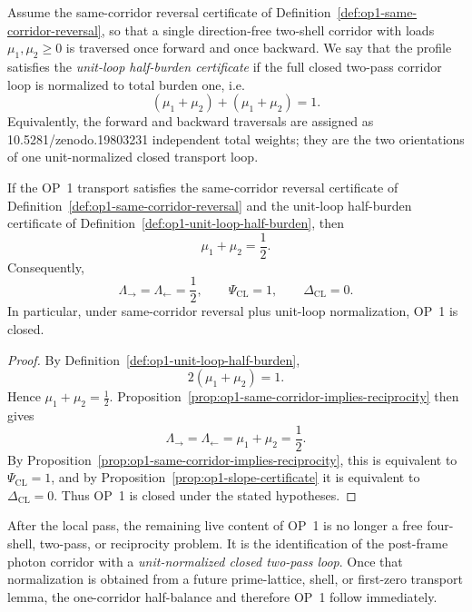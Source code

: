 \begin{definition}
\label{def:op1-unit-loop-half-burden}
Assume the same-corridor reversal certificate of Definition~\ref{def:op1-same-corridor-reversal}, so that a single direction-free two-shell corridor with loads \(\mu_1,\mu_2\ge 0\) is traversed once forward and once backward. We say that the profile satisfies the \emph{unit-loop half-burden certificate} if the full closed two-pass corridor loop is normalized to total burden one, i.e.
\[
 (\mu_1+\mu_2)+(\mu_1+\mu_2)=1.
\]
Equivalently, the forward and backward traversals are assigned as 10.5281/zenodo.19803231 independent total weights; they are the two orientations of one unit-normalized closed transport loop.
\end{definition}

\begin{proposition}
\label{prop:op1-unit-loop-half-burden}
If the OP~1 transport satisfies the same-corridor reversal certificate of Definition~\ref{def:op1-same-corridor-reversal} and the unit-loop half-burden certificate of Definition~\ref{def:op1-unit-loop-half-burden}, then
\[
 \mu_1+\mu_2=\frac12.
\]
Consequently,
\[
 \Lambda_{\rightarrow}=\Lambda_{\leftarrow}=\frac12,
\qquad
 \Psi_{\mathrm{CL}}=1,
\qquad
 \Delta_{\mathrm{CL}}=0.
\]
In particular, under same-corridor reversal plus unit-loop normalization, OP~1 is closed.
\end{proposition}

\begin{proof}
By Definition~\ref{def:op1-unit-loop-half-burden},
\[
 2(\mu_1+\mu_2)=1.
\]
Hence \(\mu_1+\mu_2=\tfrac12\). Proposition~\ref{prop:op1-same-corridor-implies-reciprocity} then gives
\[
 \Lambda_{\rightarrow}=\Lambda_{\leftarrow}=\mu_1+\mu_2=\frac12.
\]
By Proposition~\ref{prop:op1-same-corridor-implies-reciprocity}, this is equivalent to \(\Psi_{\mathrm{CL}}=1\), and by Proposition~\ref{prop:op1-slope-certificate} it is equivalent to \(\Delta_{\mathrm{CL}}=0\). Thus OP~1 is closed under the stated hypotheses.
\end{proof}

\begin{corollary}
\label{cor:op1-live-burden-after-r08}
After the local pass, the remaining live content of OP~1 is no longer a free four-shell, two-pass, or reciprocity problem. It is the identification of the post-frame photon corridor with a \emph{unit-normalized closed two-pass loop}. Once that normalization is obtained from a future prime-lattice, shell, or first-zero transport lemma, the one-corridor half-balance and therefore OP~1 follow immediately.
\end{corollary}

